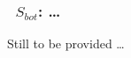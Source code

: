 \vsssub
\subsubsection{~$S_{bot}$: \ldots} \label{sec:BT2}
\vsssub


\noindent
Still to be provided \ldots